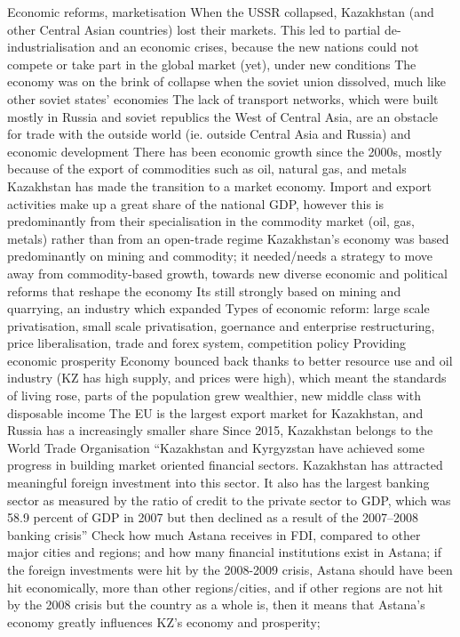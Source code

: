 \documentclass{article}
\begin{document}
\begin{outline}
	\1 Economic reforms, marketisation
		\2 When the USSR collapsed, Kazakhstan (and other Central Asian countries) lost their markets. This led to partial de-industrialisation and an economic crises, because the new nations could not compete or take part in the global market (yet), under new conditions \cite{batsaikhan2017central}
		\2 The economy was on the brink of collapse when the soviet union dissolved, much like other soviet states' economies
		\2 The lack of transport networks, which were built mostly in Russia and soviet republics the West of Central Asia, are an obstacle for trade with the outside world (ie. outside Central Asia and Russia) and economic development\cite{batsaikhan2017central}
		\2 There has been economic growth since the 2000s, mostly because of the export of commodities such as oil, natural gas, and metals
		\2 Kazakhstan has made the transition to a market economy. Import and export activities make up a great share of the national GDP, however this is predominantly from their specialisation in the commodity market (oil, gas, metals) rather than from an open-trade regime\cite{batsaikhan2017central}
		\2 Kazakhstan's economy was based predominantly on mining and commodity; it needed/needs a strategy to move away from commodity-based growth, towards new diverse economic and political reforms that reshape the economy
			\3 Its still strongly based on mining and quarrying, an industry which expanded 
		\2 Types of economic reform\cite{batsaikhan2017central}: large scale privatisation, small scale privatisation, goernance and enterprise restructuring, price liberalisation, trade and forex system, competition policy
		\2 Providing economic prosperity
		\2 Economy bounced back thanks to better resource use and oil industry (KZ has high supply, and prices were high), which meant the standards of living rose, parts of the population grew wealthier, new middle class with disposable income
		\2 The EU is the largest export market for Kazakhstan, and Russia has a increasingly smaller share
		\2 Since 2015, Kazakhstan belongs to the World Trade Organisation
		\2 ``Kazakhstan and Kyrgyzstan have achieved some progress in building market oriented financial sectors. Kazakhstan has attracted meaningful foreign investment into this sector. It also has the largest banking sector as measured by the ratio of credit to the private sector to GDP, which was 58.9 percent of GDP in 2007 but then declined as a result of the 2007–2008 banking crisis''\cite{batsaikhan2017central}
			\3 Check how much Astana receives in FDI, compared to other major cities and regions; and how many financial institutions exist in Astana; if the foreign investments were hit by the 2008-2009 crisis, Astana should have been hit economically, more than other regions/cities, and if other regions are not hit by the 2008 crisis but the country as a whole is, then it means that Astana's economy greatly influences KZ's economy and prosperity;

\end{outline}
\end{document}
